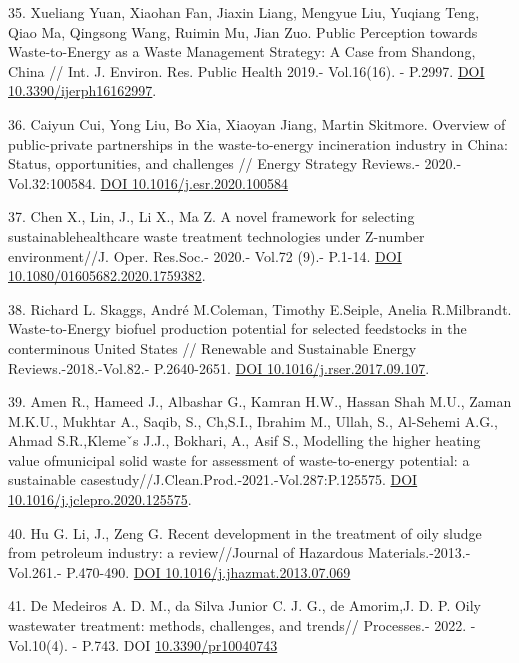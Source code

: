 \begin{references}
35. Xueliang Yuan, Xiaohan Fan, Jiaxin Liang, Mengyue Liu, Yuqiang Teng,
Qiao Ma, Qingsong Wang, Ruimin Mu, Jian Zuo. Public Perception towards
Waste-to-Energy as a Waste Management Strategy: A Case from Shandong,
China // Int. J. Environ. Res. Public Health 2019.- Vol.16(16). -
P.2997. \href{https://doi.org/10.3390/ijerph16162997}{DOI
10.3390/ijerph16162997}.

36. Caiyun Cui, Yong Liu, Bo Xia, Xiaoyan Jiang, Martin Skitmore.
Overview of public-private partnerships in the waste-to-energy
incineration industry in China: Status, opportunities, and challenges //
Energy Strategy Reviews.- 2020.- Vol.32:100584.
\href{https://doi.org/\%20DOI\%2010.1016/j.esr.2020.100584}{DOI
10.1016/j.esr.2020.100584}

37. Chen X., Lin, J., Li X., Ma Z. A novel framework for selecting
sustainablehealthcare waste treatment technologies under Z-number
environment//J. Oper. Res.Soc.- 2020.- Vol.72 (9).- P.1-14.
\href{https://doi.org/10.1080/01605682.2020.1759382}{DOI\\
10.1080/01605682.2020.1759382}.

38. Richard L. Skaggs, André M.Coleman, Timothy E.Seiple, Anelia
R.Milbrandt. Waste-to-Energy biofuel production potential for selected
feedstocks in the conterminous United States // Renewable and
Sustainable Energy Reviews.-2018.-Vol.82.- P.2640-2651.
\href{https://doi.org/10.1016/j.rser.2017.09.107}{DOI
10.1016/j.rser.2017.09.107}.

39. Amen R., Hameed J., Albashar G., Kamran H.W., Hassan Shah M.U.,
Zaman M.K.U., Mukhtar A., Saqib, S., Ch,S.I., Ibrahim M., Ullah, S.,
Al-Sehemi A.G., Ahmad S.R.,Klemeˇs J.J., Bokhari, A., Asif S., Modelling
the higher heating value ofmunicipal solid waste for assessment of
waste-to-energy potential: a sustainable
casestudy//J.Clean.Prod.-2021.-Vol.287:P.125575.
\href{https://doi.org/10.1016/j.jclepro.2020.125575}{DOI
10.1016/j.jclepro.2020.125575}.

40. Hu G. Li, J., Zeng G. Recent development in the treatment of oily
sludge from petroleum industry: a review//Journal of Hazardous
Materials.-2013.- Vol.261.- P.470-490.
\href{https://doi.org/10.1016/j.jhazmat.2013.07.069}{DOI
10.1016/j.jhazmat.2013.07.069}

41. De Medeiros A. D. M., da Silva Junior C. J. G., de Amorim,J. D. P.
Oily wastewater treatment: methods, challenges, and trends// Processes.-
2022. - Vol.10(4). - P.743. DOI
\href{http://dx.doi.org/10.3390/pr10040743}{10.3390/pr10040743}


\end{references}
